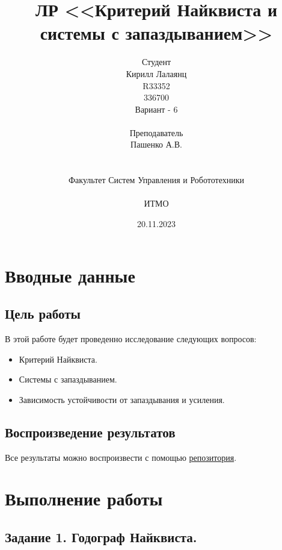 \documentclass[16pt]{article}
\title{ЛР \textnumero 6 <<Критерий Найквиста и системы с запаздыванием>>}
\author{
Студент \\
Кирилл Лалаянц\\
R33352\\
336700\\
Вариант - 6\\
\\
Преподаватель\\
Пашенко А.В. \\
\\
\\
Факультет Систем Управления и Робототехники\\
\\
ИТМО\\
}
\date{20.11.2023}
\begin{document}
\maketitle
\newpage
\tableofcontents
\thispagestyle{empty}

\newpage
\setcounter{page}{1}

\section{Вводные данные}
\subsection{Цель работы}
В этой работе будет проведенно исследование следующих вопросов:
\begin{itemize}
    \item Критерий Найквиста.
    \item Системы с запаздыванием.
    \item Зависимость устойчивости от запаздывания и усиления.
\end{itemize} 

\subsection{Воспроизведение результатов}
Все результаты можно воспроизвести с помощью \href{https://github.com/lalayants/control-theory-itmo-2023}{репозитория}.


\newpage
\section{Выполнение работы}
\label{sec:headings}


\subsection{Задание 1. Годограф Найквиста.}
\end{document}
